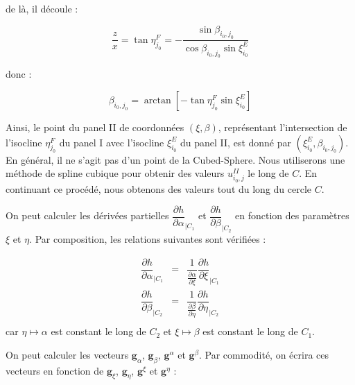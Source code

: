 de là, il découle :

\begin{equation}
\dfrac{z}{x} = \tan \eta^F_{j_0} = - \dfrac{\sin \beta_{i_0, j_0}}{\cos \beta_{i_0, j_0} \sin \xi^E_{i_0}}
\end{equation}

donc :

\begin{equation}
\beta_{i_0, j_0} = \arctan \left[ - \tan \eta^F_{j_0} \sin \xi^E_{i_0} \right]
\label{eq:coord_cross}
\end{equation}

Ainsi, le point du panel II de coordonnées $(\xi, \beta)$, représentant l'intersection de l'isocline $\eta^F_{j_0}$ du panel I avec l'isocline $\xi_{i_0}^E$ du panel II, est donné par $(\xi^E_{i_0}, \beta_{i_0, j_0})$. En général, il ne s'agit pas d'un point de la Cubed-Sphere. Nous utiliserons une méthode de spline cubique pour obtenir des valeurs $u_{i_0,j}^{II}$ le long de $C$.
En continuant ce procédé, nous obtenons des valeurs tout du long du cercle $C$.







On peut calculer les dérivées partielles $\dfrac{\partial h}{\partial \alpha}_{|C_1}$ et $\dfrac{\partial h}{\partial \beta}_{|C_2}$ en fonction des paramètres $\xi$ et $\eta$. Par composition, les relations suivantes sont vérifiées :

\begin{equation}
\begin{array}{rcl}
\dfrac{\partial h}{\partial \alpha}_{|C_1} & = &  \dfrac{1}{\frac{\partial \alpha}{\partial \xi}} \dfrac{\partial h}{\partial \xi}_{|C_1} \\
\dfrac{\partial h}{\partial \beta}_{|C_2} & = &  \dfrac{1}{\frac{\partial \beta}{\partial \eta}} \dfrac{\partial h}{\partial \eta}_{|C_2} \\
\end{array}
\label{eq: derivee partiel link}
\end{equation}
car $\eta \mapsto \alpha$ est constant le long de $C_2$ et $\xi \mapsto \beta$ est constant le long de $C_1$. 






On peut calculer les vecteurs $\mathbf{g}_{\alpha}$, $\mathbf{g}_{\beta}$, $\mathbf{g}^{\alpha}$ et $\mathbf{g}^{\beta}$. Par commodité, on écrira ces vecteurs en fonction de $\mathbf{g}_{\xi}$, $\mathbf{g}_{\eta}$, $\mathbf{g}^{\xi}$ et $\mathbf{g}^{\eta}$ :

